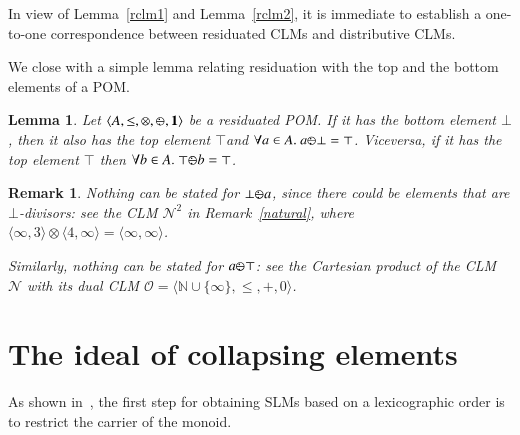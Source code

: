 \documentclass[a4paper]{elsarticle}
\newtheorem{definition}{Definition}
\newtheorem{remark}{Remark}
\newtheorem{lemma}{Lemma}
\newcommand{\monop}{\otimes}
\newcommand{\1}{\mathbf{1}}
\def\odiv{{ \ominus\hspace{-8pt}:}\;}
\begin{document}
In view of Lemma~\ref{rclm1} and Lemma~\ref{rclm2}, it is immediate to
establish a one-to-one correspondence between residuated CLMs and distributive CLMs.

%

\smallskip
We close with a simple lemma relating residuation with the top and the bottom elements of a POM.

\begin{lemma}
	\label{someProps}
	Let $\langle A, \leq, \monop, \odiv, \1 \rangle$ be a residuated POM. 
	If it has the bottom element $\bot$, then it also has the top element $\top$and
	$\forall a \in A.\ a \odiv \bot = \top$.
	Viceversa, if it has the top element $\top$ then
	$\forall b \in A.\ \top \odiv b = \top$.
\end{lemma}

\begin{remark}
\label{usualNat}
	Nothing can be stated for $\bot \odiv a$, since there could be elements that are 
	$\bot$-divisors: see the CLM $\mathcal{N}^2$ 
	in Remark~\ref{natural}, where 
	$\langle \infty, 3\rangle  \otimes \langle 4, \infty \rangle = \langle \infty,\infty \rangle$. 
	
	Similarly, nothing can be stated for $a \odiv \top$: see the Cartesian 
	product of the CLM $\mathcal{N}$ with its dual CLM
	$\mathcal{O} = \langle \mathbb N \cup \{\infty\}, \leq, +, 0 \rangle$.
\end{remark}


\section{The ideal of collapsing elements}
\label{sec:collapsing}
As shown in~\cite{GadducciHMW13}, the first step for obtaining SLMs based on a lexicographic order 
is to restrict the carrier of the monoid. 
\end{document}

